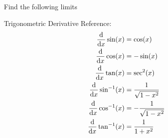 \documentclass[]{article}
\newcommand{\R}{\mathbb{R}}
\newtheorem{definition}{Definition}
\newtheorem{theorem}{Theorem}
\begin{document}

                        

\newpage
\section{}
Find the following limits

Trigonometric Derivative Reference:
\begin{align*}
    \dv{x} \sin(x) &= \cos(x)\\
    \dv{x} \cos(x) &= -\sin(x)\\
    \dv{x} \tan(x) &= \secant^2(x)\\
    \dv{x} \sin[-1](x) &= \frac{1}{\sqrt{1-x^2}}\\
    \dv{x} \cos[-1](x) &= -\frac{1}{\sqrt{1-x^2}}\\
    \dv{x} \tan[-1](x) &= \frac{1}{1 + x^2}
\end{align*}
\end{document}

